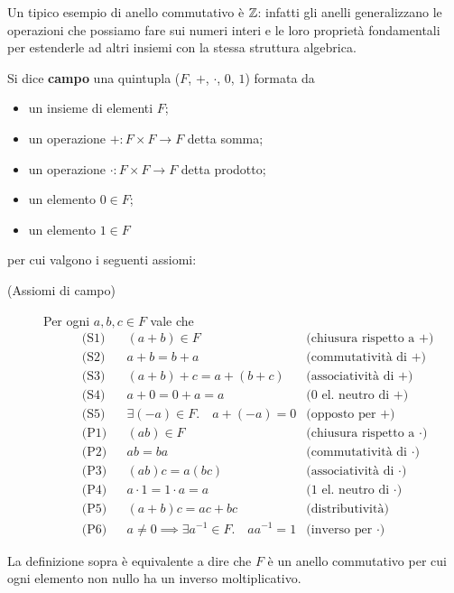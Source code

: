 Un tipico esempio di anello commutativo è $\mathbb{Z}$: infatti gli anelli generalizzano le operazioni che possiamo fare sui numeri interi e le loro proprietà fondamentali per estenderle ad altri insiemi con la stessa struttura algebrica.

\begin{definition}[Campo]
    Si dice \textbf{campo} una quintupla ($F$, $+$, $\cdot$, $0$, $1$) formata da
    \begin{itemize}
        \item un insieme di elementi $F$;
        \item un operazione $+ : F \times F \to F$ detta somma;
        \item un operazione $\cdot : F \times F \to F$ detta prodotto;
        \item un elemento $0 \in F$;
        \item un elemento $1 \in F$
    \end{itemize}  per cui valgono i seguenti assiomi: 
    \begin{description}
        \item[(Assiomi di campo)] Per ogni $a, b, c \in F$ vale che
        \begin{align*}
            &\text{(S1)}      &&(a+b) \in F           &\text{(chiusura rispetto a $+$)}\\
            &\text{(S2)}      &&a+b = b+a             &\text{(commutatività di $+$)}\\
            &\text{(S3)}      &&(a+b)+c = a+(b+c)     &\text{(associatività di $+$)}\\
            &\text{(S4)}      &&a+0=0+a=a             &\text{(0 el. neutro di $+$)}\\
            &\text{(S5)}      &&\exists (-a) \in F. \quad a+(-a) = 0 &\text{(opposto per $+$)}\\
            &\text{(P1)}      &&(ab) \in F            &\text{(chiusura rispetto a $\cdot$)}\\        
            &\text{(P2)}      &&ab = ba               &\text{(commutatività di $\cdot$)}\\
            &\text{(P3)}      &&(ab)c = a(bc)         &\text{(associatività di $\cdot$)}\\
            &\text{(P4)}      &&a \cdot 1=1 \cdot a=a &\text{(1 el. neutro di $\cdot$)}\\
            &\text{(P5)}     &&(a+b)c = ac + bc      &\text{(distributività)} \\
            &\text{(P6)}     &&a \neq 0 \implies \exists a^{-1} \in F. \quad aa^{-1} = 1 &\text{(inverso per $\cdot$)}
        \end{align*}
    \end{description} 

    La definizione sopra è equivalente a dire che $F$ è un anello commutativo per cui ogni elemento non nullo ha un inverso moltiplicativo.
\end{definition}


